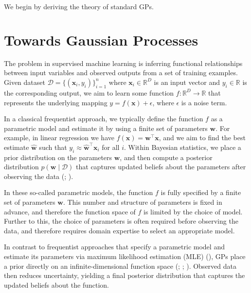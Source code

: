 \documentclass[
  letterpaper,
  DIV=11,
  numbers=noendperiod]{scrartcl}
\begin{document}
We begin by deriving the theory of standard GPs.

\section{Towards Gaussian Processes}\label{sec-gps}

The problem in supervised machine learning is inferring functional
relationships between input variables and observed outputs from a set of
training examples. Given dataset
\(\mathcal{D} = \{(\mathbf{x}_i, y_i)\}_{i=1}^n\) where
\(\mathbf{x}_i \in \mathbb{R}^D\) is an input vector and
\(y_i \in \mathbb{R}\) is the corresponding output, we aim to learn some
function \(f: \mathbb{R}^D \to \mathbb{R}\) that represents the
underlying mapping \(y = f(\mathbf{x}) + \epsilon\), where \(\epsilon\)
is a noise term.

In a classical frequentist approach, we typically define the function
\(f\) as a parametric model and estimate it by using a finite set of
parameters \(\mathbf{w}\). For example, in linear regression we have
\(f(\mathbf{x}) = \mathbf{w}^\top \mathbf{x}\), and we aim to find the
best estimate \(\hat{\mathbf{w}}\) such that
\(y_i \approx \hat{\mathbf{w}}^\top \mathbf{x}_i\) for all \(i\). Within
Bayesian statistics, we place a prior distribution on the parameters
\(\mathbf{w}\), and then compute a posterior distribution
\(p(\mathbf{w} \mid \mathcal{D})\) that captures updated beliefs about
the parameters after observing the data
(;
).

In these so-called parametric models, the function \(f\) is fully
specified by a finite set of parameters \(\mathbf{w}\). This number and
structure of parameters is fixed in advance, and therefore the function
space of \(f\) is limited by the choice of model. Further to this, the
choice of parameters is often required before observing the data, and
therefore requires domain expertise to select an appropriate model.

In contrast to frequentist approaches that specify a parametric model
and estimate its parameters via maximum likelihood estimation (MLE)
(), GPs place a prior
directly on an infinite-dimensional function space
(;
;
).
Observed data then reduces uncertainty, yielding a final posterior
distribution that captures the updated beliefs about the function.
\end{document}
